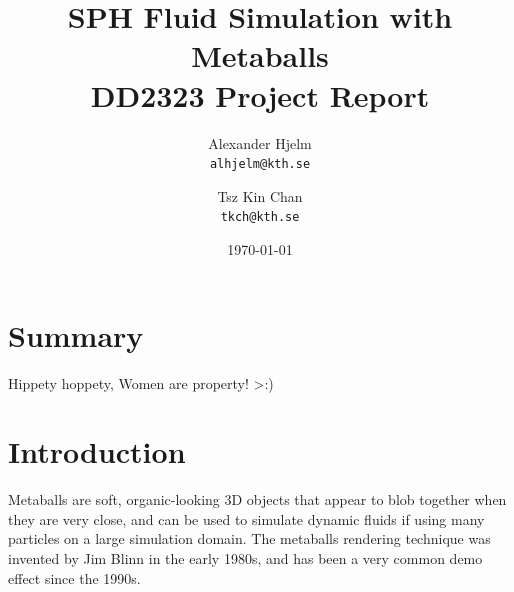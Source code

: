 \documentclass{article}
\begin{document}
    \title{%
    	\textbf{SPH Fluid Simulation with Metaballs} \\
    	\large DD2323 Project Report \\}
   
	\author{
		Alexander Hjelm\\
		\texttt{alhjelm@kth.se}
		\and
		Tsz Kin Chan\\
		\texttt{tkch@kth.se}
	}

    \date{\today}

    \maketitle
    
    \begin{multicols}{2}

    \section{Summary}
    Hippety hoppety, Women are property! >:)
    
    \section{Introduction}
    
    Metaballs are soft, organic-looking 3D objects that appear to blob together when they are very close, and can be used to simulate dynamic fluids if using many particles on a large simulation domain. 
    The metaballs rendering technique was invented by Jim Blinn in the early 1980s, and has been a very common demo effect since the 1990s.


\end{multicols}
\end{document}
